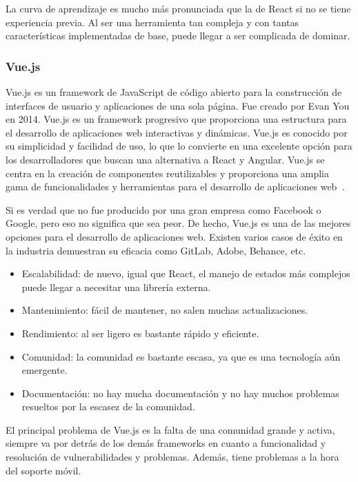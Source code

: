 La curva de aprendizaje es mucho más pronunciada que la de React si no se tiene experiencia previa. Al ser una herramienta tan compleja y con tantas características implementadas de base, puede llegar a ser complicada de dominar. 

\subsubsection{Vue.js}

Vue.js es un framework de JavaScript de código abierto para la construcción de interfaces de usuario y aplicaciones de una sola página. Fue creado por Evan You en 2014. Vue.js es un framework progresivo que proporciona una estructura para el desarrollo de aplicaciones web interactivas y dinámicas. Vue.js es conocido por su simplicidad y facilidad de uso, lo que lo convierte en una excelente opción para los desarrolladores que buscan una alternativa a React y Angular. Vue.js se centra en la creación de componentes reutilizables y proporciona una amplia gama de funcionalidades y herramientas para el desarrollo de aplicaciones web~\cite{vuejs-wikipedia}.

Si es verdad que no fue producido por una gran empresa como Facebook o Google, pero eso no significa que sea peor. De hecho, Vue.js es una de las mejores opciones para el desarrollo de aplicaciones web. Existen varios casos de éxito en la industria demuestran su eficacia como GitLab, Adobe, Behance, etc.

\begin{itemize}
    \item[\bien] Escalabilidad: de nuevo, igual que React, el manejo de estados más complejos puede llegar a necesitar una librería externa.
    \item[\bien] Mantenimiento: fácil de mantener, no salen muchas actualizaciones.
    \item[\bien] Rendimiento: al ser ligero es bastante rápido y eficiente.
    \item[\mal] Comunidad: la comunidad es bastante escasa, ya que es una tecnología aún emergente.
    \item[\mal] Documentación: no hay mucha documentación y no hay muchos problemas resueltos por la escasez de la comunidad.
\end{itemize}

El principal problema de Vue.js es la falta de una comunidad grande y activa, siempre va por detrás de los demás frameworks en cuanto a funcionalidad y resolución de vulnerabilidades y problemas. Además, tiene problemas a la hora del soporte móvil.

